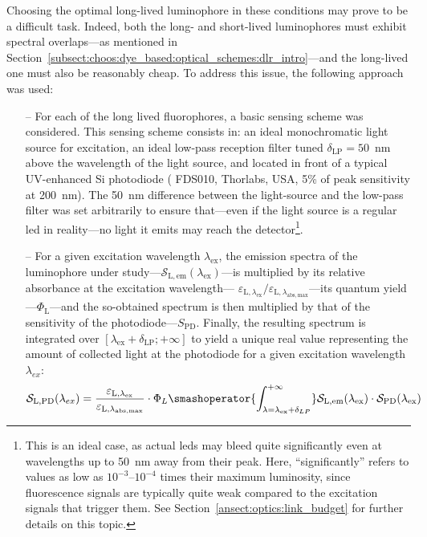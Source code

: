 Choosing the optimal long-lived luminophore in these conditions may prove to be a difficult task. Indeed, both the long- and short-lived luminophores must exhibit spectral overlaps---as mentioned in Section~\ref{subsect:choos:dye_based:optical_schemes:dlr_intro}---and the long-lived one must also be reasonably cheap. To address this issue, the following approach was used:
\begin{itemize}
	\item[--] For each of the long lived fluorophores, a basic sensing scheme was considered. This sensing scheme consists in: an ideal monochromatic light source for excitation, an ideal low-pass reception filter tuned $\delta_\mathrm{LP}=50$~nm above the wavelength of the light source, and located in front of a typical UV-enhanced Si photodiode (\eg{} FDS010, Thorlabs, USA, 5\% of peak sensitivity at 200~nm). The 50~nm difference between the light-source and the low-pass filter was set arbitrarily to ensure that---even if the light source is a regular \gls{led} in reality---no light it emits may reach the detector\footnote{This is an ideal case, as actual \glspl{led} may bleed quite significantly even at wavelengths up to 50~nm away from their peak. Here, \enquote{significantly} refers to values as low as $10^{-3}$--$10^{-4}$ times their maximum luminosity, since fluorescence signals are typically quite weak compared to the excitation signals that trigger them. See Section~\ref{ansect:optics:link_budget} for further details on this topic.}.
	\item[--] For a given excitation wavelength $\lambda_\mathrm{ex}$, the emission spectra of the luminophore under study---$\mathcal{S}_\mathrm{L,em}(\lambda_\mathrm{ex})$---is multiplied by its relative absorbance at the excitation wavelength--- $\varepsilon_{\mathrm{L},\lambda_\mathrm{ex}}/\varepsilon_{\mathrm{L},\lambda_\mathrm{abs,max}}$---its quantum yield---$\Phi_\mathrm{L}$---and the so-obtained spectrum is then multiplied by that of the sensitivity of the photodiode---$S_\mathrm{PD}$. Finally, the resulting spectrum is integrated over $\left[ \lambda_\mathrm{ex} + \delta_\mathrm{LP};+\infty \right]$ to yield a unique real value representing the amount of collected light at the photodiode for a given excitation wavelength $\lambda_{ex}$:
	\begin{equation}
		\mathcal{S}_\mathrm{L,PD}(\lambda_{ex}) = \frac{\varepsilon_{\mathrm{L},\lambda_\mathrm{ex}}}{\varepsilon_{\mathrm{L},\lambda_\mathrm{abs,max}}} \cdot \Phi_L \smashoperator{\int_{\lambda = \lambda_\mathrm{ex} + \delta_{LP}}^{+ \infty}} \mathcal{S}_\mathrm{L,em}(\lambda_\mathrm{ex}) \cdot \mathcal{S}_\mathrm{PD}(\lambda_\mathrm{ex})

\end{equation}
\end{itemize}
